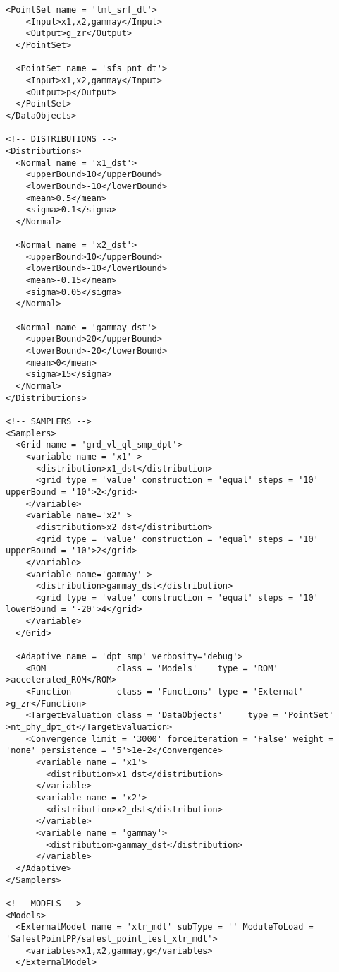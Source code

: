 \begin{lstlisting}[style=XML,morekeywords={debug,re,seeding,class,subType,limit}]
  <PointSet name = 'lmt_srf_dt'>
    <Input>x1,x2,gammay</Input>
    <Output>g_zr</Output>
  </PointSet>
  
  <PointSet name = 'sfs_pnt_dt'>
    <Input>x1,x2,gammay</Input>
    <Output>p</Output>
  </PointSet>
</DataObjects>

<!-- DISTRIBUTIONS -->
<Distributions>
  <Normal name = 'x1_dst'>
    <upperBound>10</upperBound>
    <lowerBound>-10</lowerBound>
  	<mean>0.5</mean>
    <sigma>0.1</sigma>
  </Normal>
  
  <Normal name = 'x2_dst'>
    <upperBound>10</upperBound>
    <lowerBound>-10</lowerBound>
    <mean>-0.15</mean>
    <sigma>0.05</sigma>
  </Normal>
  
  <Normal name = 'gammay_dst'>
    <upperBound>20</upperBound>
    <lowerBound>-20</lowerBound>
    <mean>0</mean>
    <sigma>15</sigma>
  </Normal>
</Distributions>

<!-- SAMPLERS -->
<Samplers>  
  <Grid name = 'grd_vl_ql_smp_dpt'>
    <variable name = 'x1' >
      <distribution>x1_dst</distribution>
      <grid type = 'value' construction = 'equal' steps = '10' upperBound = '10'>2</grid>
    </variable>  
    <variable name='x2' >
      <distribution>x2_dst</distribution>
      <grid type = 'value' construction = 'equal' steps = '10' upperBound = '10'>2</grid>
    </variable>
    <variable name='gammay' >
      <distribution>gammay_dst</distribution>
      <grid type = 'value' construction = 'equal' steps = '10' lowerBound = '-20'>4</grid>
    </variable>
  </Grid>
  
  <Adaptive name = 'dpt_smp' verbosity='debug'>
    <ROM              class = 'Models'    type = 'ROM'           >accelerated_ROM</ROM>
    <Function         class = 'Functions' type = 'External'      >g_zr</Function>
    <TargetEvaluation class = 'DataObjects'     type = 'PointSet'  >nt_phy_dpt_dt</TargetEvaluation>
    <Convergence limit = '3000' forceIteration = 'False' weight = 'none' persistence = '5'>1e-2</Convergence>
      <variable name = 'x1'>
        <distribution>x1_dst</distribution>
      </variable>
      <variable name = 'x2'>
        <distribution>x2_dst</distribution>
      </variable>
      <variable name = 'gammay'>
        <distribution>gammay_dst</distribution>
      </variable>
  </Adaptive>
</Samplers>

<!-- MODELS -->
<Models>  
  <ExternalModel name = 'xtr_mdl' subType = '' ModuleToLoad = 'SafestPointPP/safest_point_test_xtr_mdl'>
    <variables>x1,x2,gammay,g</variables>
  </ExternalModel>
  

\end{lstlisting}
